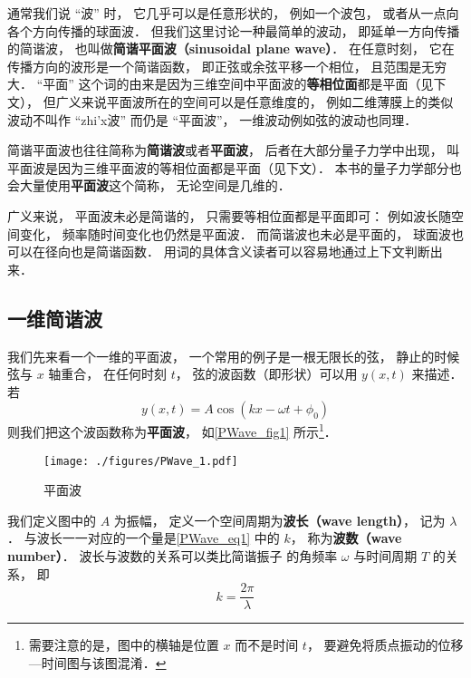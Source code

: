 

通常我们说 “波” 时， 它几乎可以是任意形状的， 例如一个波包， 或者从一点向各个方向传播的球面波． 但我们这里讨论一种最简单的波动， 即延单一方向传播的简谐波， 也叫做\textbf{简谐平面波（sinusoidal plane wave）}． 在任意时刻， 它在传播方向的波形是一个简谐函数， 即正弦或余弦平移一个相位， 且范围是无穷大． “平面” 这个词的由来是因为三维空间中平面波的\textbf{等相位面}都是平面（见下文）， 但广义来说平面波所在的空间可以是任意维度的， 例如二维薄膜上的类似波动不叫作 “zhi'x波” 而仍是 “平面波”， 一维波动例如弦的波动也同理．

简谐平面波也往往简称为\textbf{简谐波}或者\textbf{平面波}， 后者在大部分量子力学中出现， 叫平面波是因为三维平面波的等相位面都是平面（见下文）． 本书的量子力学部分也会大量使用\textbf{平面波}这个简称， 无论空间是几维的．

广义来说， 平面波未必是简谐的， 只需要等相位面都是平面即可： 例如波长随空间变化， 频率随时间变化也仍然是平面波． 而简谐波也未必是平面的， 球面波也可以在径向也是简谐函数． 用词的具体含义读者可以容易地通过上下文判断出来．

\subsection{一维简谐波}
我们先来看一个一维的平面波， 一个常用的例子是一根无限长的弦， 静止的时候弦与 $x$ 轴重合， 在任何时刻 $t$， 弦的波函数（即形状）可以用 $y(x, t)$ 来描述． 若
\begin{equation}\label{PWave_eq1}
y(x, t) = A\cos(k x - \omega t + \phi_0)
\end{equation}
则我们把这个波函数称为\textbf{平面波}， 如\autoref{PWave_fig1} 所示\footnote{需要注意的是，图中的横轴是位置 $x$ 而不是时间 $t$， 要避免将质点振动的位移—时间图与该图混淆．}．

\begin{figure}[ht]
\centering
\texttt{[image: ./figures/PWave\_1.pdf]}
\caption{平面波} \label{PWave_fig1}
\end{figure}

我们定义图中的 $A$ 为振幅， 定义一个空间周期为\textbf{波长（wave length）}， 记为 $\lambda$． 与波长一一对应的一个量是\autoref{PWave_eq1} 中的 $k$， 称为\textbf{波数（wave number）}． 波长与波数的关系可以类比简谐振子 的角频率 $\omega$ 与时间周期 $T$ 的关系， 即
\begin{equation}\label{PWave_eq2}
k = \frac{2\pi}{\lambda}
\end{equation}


